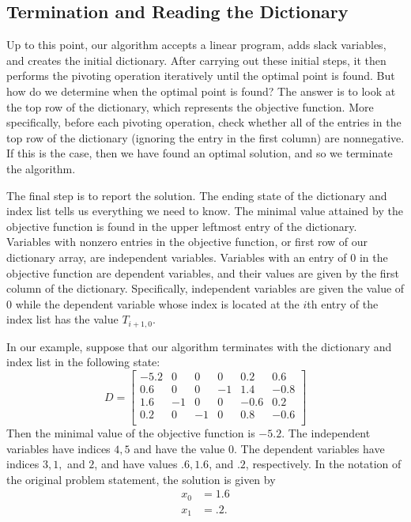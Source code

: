 \vspace{2mm}

\subsection*{Termination and Reading the Dictionary} %

Up to this point, our algorithm accepts a linear program, adds slack variables, and creates the initial dictionary.
After carrying out these initial steps, it then performs the pivoting operation iteratively until the optimal point is found.
But how do we determine when the optimal point is found? The answer is to look at the top row of the dictionary, which represents the objective function.
More specifically, before each pivoting operation, check whether all of the entries in the top row of the dictionary (ignoring the entry in the first column) are nonnegative.
If this is the case, then we have found an optimal solution, and so we terminate the algorithm.

The final step is to report the solution.
The ending state of the dictionary and index list tells us everything we need to know.
The minimal value attained by the objective function is found in the upper leftmost entry of the dictionary.
Variables with nonzero entries in the objective function, or first row of our dictionary array, are independent variables. Variables with an entry of $0$ in the objective function are dependent variables, and their values are given by the first column of the dictionary.
Specifically, independent variables are given the value of $0$ while the dependent variable whose index is located at the $i$th entry of the index list has the value $T_{i+1, 0}$.

In our example, suppose that our algorithm terminates with the dictionary and index list in the following state:
\[
D = \begin{bmatrix}
-5.2 & 0 & 0 & 0 & 0.2 & 0.6\\
0.6 & 0 & 0 & -1 & 1.4 & -0.8\\
1.6 & -1 & 0 & 0 & -0.6 & 0.2\\
0.2 & 0 & -1 & 0 & 0.8 & -0.6\\
\end{bmatrix}
\]
Then the minimal value of the objective function is $-5.2$.
The independent variables have indices $4, 5$ and have the value $0$.
The dependent variables have indices $3, 1,$ and $2$, and have values $.6, 1.6$, and $.2$, respectively.
In the notation of the original problem statement, the solution is given by
\begin{align*}
x_0 &= 1.6\\
x_1 &= .2.
\end{align*}

